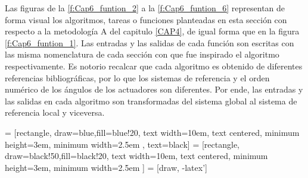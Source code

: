     Las figuras de la \ref{f:Cap6_funtion_2} a la \ref{f:Cap6_funtion_6} representan de forma visual los algoritmos, tareas o funciones planteadas en esta sección con respecto a la  metodología A del capitulo \ref{CAP4}, de igual forma que en la figura \ref{f:Cap6_funtion_1}. Las entradas y las salidas de cada función son escritas con las misma nomenclatura de cada sección con que fue inspirado el algoritmo respectivamente. Es notorio recalcar que cada algoritmo es obtenido de diferentes referencias bibliográficas, por lo que los sistemas de referencia y el orden numérico de los ángulos de los actuadores son diferentes. Por ende, las entradas y las salidas en cada algoritmo son transformadas del sistema global al sistema de referencia local y viceversa.     
    

            \hspace{1cm}


     = [rectangle, draw=blue,fill=blue!20, text width=10em, text centered, minimum height=3em, minimum width=2.5em , text=black]
     = [rectangle, draw=black!50,fill=black!20, text width=10em, text centered, minimum height=3em, minimum width=2.5em ]
     = [draw, -latex']

